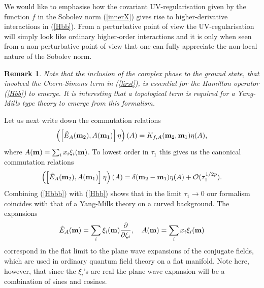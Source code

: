 \documentclass[12pt]{article}
\def\d{\delta}
\def\co{{\cal O}}
\newcommand{\pa}{\partial}
\newtheorem{remark}{Remark}
\begin{document}
We would like to emphasise how the covariant UV-regularisation given by the function $f$ in the Sobolev norm (\ref{innerX}) gives rise to higher-derivative interactions in (\ref{Hbb}). From a perturbative point of view the UV-regularisation will simply look like ordinary higher-order interactions and it is only when seen from a non-perturbative point of view that one can fully appreciate the non-local nature of the Sobolev norm.






\begin{remark}
Note that the inclusion of the complex phase to the ground state, that involved the Chern-Simons term in (\ref{first}), is essential for the Hamilton operator (\ref{Hbb}) to emerge. It is interesting that a topological term is required for a Yang-Mills type theory to emerge from this formalism. 
\end{remark}






Let us next write down the commutation relations
$$
\left( \left[ \hat{E}_A({\bf m}_2),{A}({\bf m}_1) \right] \eta\right)(A)  = K_{f,A}({\bf m}_2,{\bf m}_1) \eta(A),
$$
where $A({\bf m})=\sum_i x_i \xi_i({\bf m})$. To lowest order in $\tau_1$ this gives us the canonical commutation relations
\begin{equation}
\left( \left[ \hat{E}_A ({\bf m}_2),{A}({\bf m}_1) \right]\eta\right)(A)  = \d({\bf m}_2-{\bf m}_1) \eta(A) + \co(\tau_1^{{1/2p}}).
\label{Hbbb}
\end{equation} 
Combining (\ref{Hbbb}) with (\ref{Hbb}) shows that in the limit $\tau_1\rightarrow 0$ our formalism coincides with that of a Yang-Mills theory on a curved background. The expansions 
$$
\hat{E}_A ({\bf m})=\sum_i \xi_i({\bf m})\frac{\pa}{\pa \xi_i},\quad A({\bf m})=\sum_i x_i \xi_i({\bf m})
$$ 
correspond in the flat limit to the plane wave expansions of the conjugate fields, which are used in ordinary quantum field theory on a flat manifold. Note here, however, that since the $\xi_i$'s are real the plane wave expansion will be a combination of sines and cosines.  
\end{document}
